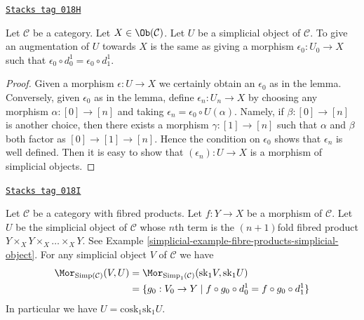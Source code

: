 \begin{lemma}
\label{simplicial-lemma-augmentation-howto}
\href{https://stacks.math.columbia.edu/tag/018H}{\texttt{Stacks tag 018H}}

Let $\mathcal{C}$ be a category.
Let $X \in \Ob(\mathcal{C})$.
Let $U$ be a simplicial object of $\mathcal{C}$.
To give an augmentation of $U$ towards $X$ is
the same as giving a morphism $\epsilon_0 : U_0 \to X$
such that $\epsilon_0 \circ d^1_0 = \epsilon_0 \circ d^1_1$.
\end{lemma}

\begin{proof}
Given a morphism $\epsilon : U \to X$
we certainly obtain an $\epsilon_0$ as in the lemma.
Conversely, given $\epsilon_0$ as in the lemma, define
$\epsilon_n : U_n \to X$ by choosing any
morphism $\alpha : [0] \to [n]$ and taking
$\epsilon_n = \epsilon_0 \circ U(\alpha)$.
Namely, if $\beta : [0] \to [n]$ is another
choice, then there exists a morphism
$\gamma : [1] \to [n]$ such that $\alpha$
and $\beta$ both factor as $[0] \to [1] \to [n]$.
Hence the condition on $\epsilon_0$ shows that
$\epsilon_n$ is well defined. Then it is
easy to show that $(\epsilon_n) : U \to X$
is a morphism of simplicial objects.
\end{proof}

\begin{lemma}
\label{simplicial-lemma-cosk-minus-one}
\href{https://stacks.math.columbia.edu/tag/018I}{\texttt{Stacks tag 018I}}

Let $\mathcal{C}$ be a category with fibred products.
Let $f : Y\to X$ be a morphism of $\mathcal{C}$. Let $U$ be the
simplicial object of $\mathcal{C}$ whose $n$th term
is the $(n + 1)$fold fibred product
$Y \times_X Y \times_X \ldots \times_X Y$.
See Example \ref{simplicial-example-fibre-products-simplicial-object}.
For any simplicial object $V$ of $\mathcal{C}$ we have
\begin{align*}
\Mor_{\text{Simp}(\mathcal{C})}(V, U)
& =
\Mor_{\text{Simp}_1(\mathcal{C})}(\text{sk}_1 V, \text{sk}_1 U) \\
& =
\{g_0 : V_0 \to Y \mid f \circ g_0 \circ d^1_0 = f \circ g_0 \circ d^1_1\}
\end{align*}
In particular we have $U = \text{cosk}_1 \text{sk}_1 U$.
\end{lemma}

